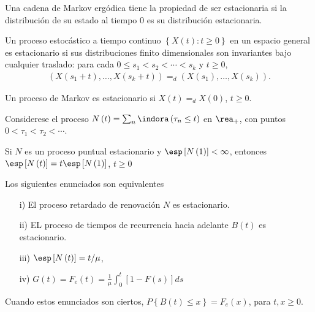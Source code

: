 Una cadena de Markov erg\'odica tiene la propiedad de ser estacionaria si la distribuci\'on de su estado al tiempo $0$ es su distribuci\'on estacionaria.


\begin{Def}
Un proceso estoc\'astico a tiempo continuo $\left\{X\left(t\right):t\geq0\right\}$ en un espacio general es estacionario si sus distribuciones finito dimensionales son invariantes bajo cualquier  traslado: para cada $0\leq s_{1}<s_{2}<\cdots<s_{k}$ y $t\geq0$,
\begin{eqnarray*}
\left(X\left(s_{1}+t\right),\ldots,X\left(s_{k}+t\right)\right)=_{d}\left(X\left(s_{1}\right),\ldots,X\left(s_{k}\right)\right).
\end{eqnarray*}
\end{Def}

\begin{Note}
Un proceso de Markov es estacionario si $X\left(t\right)=_{d}X\left(0\right)$, $t\geq0$.
\end{Note}

Considerese el proceso $N\left(t\right)=\sum_{n}\indora\left(\tau_{n}\leq t\right)$ en $\rea_{+}$, con puntos $0<\tau_{1}<\tau_{2}<\cdots$.

\begin{Prop}
Si $N$ es un proceso puntual estacionario y $\esp\left[N\left(1\right)\right]<\infty$, entonces $\esp\left[N\left(t\right)\right]=t\esp\left[N\left(1\right)\right]$, $t\geq0$

\end{Prop}

\begin{Teo}
Los siguientes enunciados son equivalentes
\begin{itemize}
\item[i)] El proceso retardado de renovaci\'on $N$ es estacionario.

\item[ii)] EL proceso de tiempos de recurrencia hacia adelante $B\left(t\right)$ es estacionario.


\item[iii)] $\esp\left[N\left(t\right)\right]=t/\mu$,


\item[iv)] $G\left(t\right)=F_{e}\left(t\right)=\frac{1}{\mu}\int_{0}^{t}\left[1-F\left(s\right)\right]ds$
\end{itemize}
Cuando estos enunciados son ciertos, $P\left\{B\left(t\right)\leq x\right\}=F_{e}\left(x\right)$, para $t,x\geq0$.

\end{Teo}

